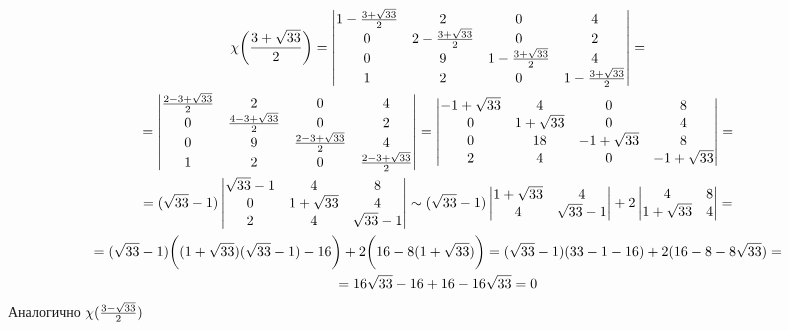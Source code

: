 \begin{multline*}
    \chi \bigg( \half[3 + \sqrt{33}] \bigg) =
    \begin{vmatrix}
        1 - \half[3 + \sqrt{33}] & 2 & 0 & 4 \\
        0 & 2 - \half[3 + \sqrt{33}] & 0 & 2 \\
        0 & 9 & 1 - \half[3 + \sqrt{33}] & 4 \\
        1 & 2 & 0 & 1 - \half[3 + \sqrt{33}]
    \end{vmatrix} = \\
    =
    \begin{vmatrix}
        \half[2 - 3 + \sqrt{33}] & 2 & 0 & 4 \\
        0 & \half[4 - 3 + \sqrt{33}] & 0 & 2 \\
        0 & 9 & \half[2 - 3 + \sqrt{33}] & 4 \\
        1 & 2 & 0 & \half[2 - 3 + \sqrt{33}]
    \end{vmatrix} =
    \begin{vmatrix}
        -1 + \sqrt{33} & 4 & 0 & 8 \\
        0 & 1 + \sqrt{33} & 0 & 4 \\
        0 & 18 & -1 + \sqrt{33} & 8 \\
        2 & 4 & 0 & -1 + \sqrt{33}
    \end{vmatrix} = \\
    = (\sqrt{33} - 1)
    \begin{vmatrix}
        \sqrt{33} - 1 & 4 & 8 \\
        0 & 1 + \sqrt{33} & 4 \\
        2 & 4 & \sqrt{33} - 1
    \end{vmatrix} \sim (\sqrt{33} - 1)
    \begin{vmatrix}
        1 + \sqrt{33} & 4 \\
        4 & \sqrt{33} - 1
    \end{vmatrix} + 2
    \begin{vmatrix}
    	4 & 8 \\
        1 + \sqrt{33} & 4
    \end{vmatrix} = \\
    = (\sqrt{33} - 1) \bigg( (1 + \sqrt{33})(\sqrt{33} - 1) - 16 \bigg) + 2 \bigg( 16 - 8(1 + \sqrt{33}) \bigg) = (\sqrt{33} - 1)(33 - 1 - 16) + 2(16 - 8 - 8\sqrt{33}) = \\
    = 16\sqrt{33} - 16 + 16 - 16\sqrt{33} = 0
\end{multline*}
Аналогично $ \chi(\half[3 - \sqrt{33}]) $
